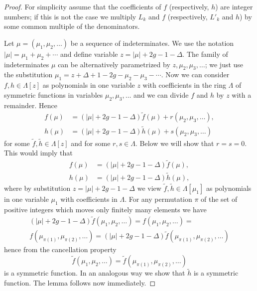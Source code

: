 \documentclass[12pt]{amsart}
\theoremstyle{plain}
\theoremstyle{remark}
\begin{document}
\begin{proof}
For simplicity assume that the coefficients of $f$ (respectively, $h$)
are integer numbers; if this is not the case we multiply $L_{k}$ and $f$
(respectively, $L'_k$ and $h$) by some common multiple of the denominators.

Let $\mu=(\mu_1,\mu_2,\dots)$ be a sequence of indeterminates. We use the
notation $|\mu|=\mu_1+\mu_2+\cdots$ and define variable
$z=|\mu|+2g-1-\Delta$. The family of indeterminates $\mu$ can be alternatively
parametrized by $z,\mu_2,\mu_3,\dots$; we just use the substitution
$\mu_1=z+\Delta+1-2g-\mu_2-\mu_3-\cdots$.  Now we can consider $f,h \in
\Lambda[z]$ as polynomials in one variable $z$ with coefficients in the ring
$\Lambda$ of symmetric functions in variables $\mu_2,\mu_3,\dots$
and we can divide $f$ and $h$ by $z$ with
a remainder. Hence
\begin{align*} f(\mu)&= (|\mu|+2g-1-\Delta) \tilde{f}(\mu) +
r(\mu_2,\mu_3,\dots), \\ 
h(\mu)&= (|\mu|+2g-1-\Delta) \tilde{h}(\mu) +
s(\mu_2,\mu_3,\dots)  
\end{align*}
for some $\tilde{f}, \tilde{h} \in \Lambda[z]$ and for some $r, s \in \Lambda$.
Below we will show that $r=s=0$. This would imply that
\begin{align*} f(\mu)&= (|\mu|+2g-1-\Delta) \tilde{f}(\mu), \\
h(\mu)&= (|\mu|+2g-1-\Delta) \tilde{h}(\mu),
\end{align*}
where by substitution $z=|\mu|+2g-1-\Delta$ we view $\tilde{f},\tilde{h}\in
\Lambda[\mu_1]$ as polynomials in one variable $\mu_1$ with coefficients in
$\Lambda$. For any permutation $\pi$ of the set of positive integers which
moves only finitely many elements we have
\begin{multline*} (|\mu|+2g-1-\Delta) \tilde{f}(\mu_1,\mu_2,\dots) =
f(\mu_1,\mu_2,\dots) =\\ f(\mu_{\pi(1)},\mu_{\pi(2)},\dots) =
(|\mu|+2g-1-\Delta) \tilde{f}(\mu_{\pi(1)},\mu_{\pi(2)},\dots)
\end{multline*}
hence from the cancellation property
$$ \tilde{f}(\mu_1,\mu_2,\dots) = \tilde{f}(\mu_{\pi(1)},\mu_{\pi(2)},\dots)$$
is a symmetric function. In an analogous way we show that $\tilde{h}$ is a
symmetric function. The lemma follows now immediately.


\end{proof}
\end{document}
